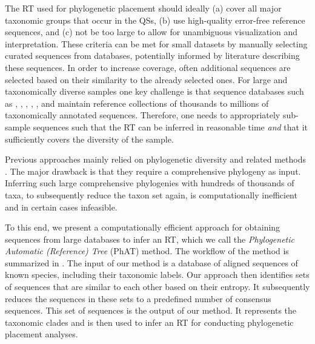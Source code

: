 The \ac{RT} used for phylogenetic placement should ideally
(a) cover all major taxonomic groups that occur in the \acp{QS},
(b) use high-quality error-free reference sequences, and
(c) not be too large to allow for unambiguous visualization and interpretation.
These criteria can be met for small datasets by manually selecting curated sequences from databases,
potentially informed by literature describing these sequences.
In order to increase coverage, often additional sequences are selected
based on their similarity to the already selected ones.
For large and taxonomically diverse samples one key challenge is that sequence databases such as
 \cite{DeSantis2006},  \cite{Abarenkov2010},  \cite{Guillou2012},
 \cite{Kim2012},  \cite{Quast2013}, and  \cite{Cole2014}
maintain reference collections of thousands to millions of taxonomically annotated sequences.
Therefore, one needs to appropriately sub-sample sequences such that the \ac{RT}
can be inferred in reasonable time {\em and} that it sufficiently covers the diversity of the sample.

Previous approaches mainly relied on phylogenetic diversity
\cite{Faith1992,Pardi2005,Minh2006} and related methods \cite{Matsen2013}.
The major drawback is that they require a comprehensive phylogeny as input.
Inferring such large comprehensive phylogenies with hundreds of thousands of taxa,
to subsequently reduce the taxon set again, is computationally inefficient and in certain cases infeasible.

To this end, we present a computationally efficient approach
for obtaining sequences from large databases to infer an \ac{RT},
which we call the \emph{Phylogenetic Automatic (Reference) Tree} (PhAT) method. 
The workflow of the method is summarized in .
The input of our method is a database of aligned sequences of known species, including their taxonomic labels.
Our approach then identifies sets of sequences that are similar to each other based on their entropy.
It subsequently reduces the sequences in these sets to a predefined number of consensus sequences.
This set of sequences is the output of our method.
It represents the taxonomic clades and is then used to infer an \ac{RT} for conducting phylogenetic placement analyses.

